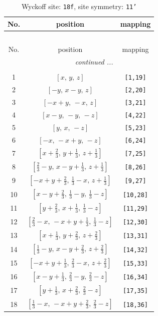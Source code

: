 \documentclass[fleqn,8pt]{jsarticle}
\begin{document}
\begin{longtable}{ccc}
\caption{Wyckoff site: {\tt 18f}, site symmetry: {\tt 11'}}
 \\
 \hline \hline
No. & position & mapping \\ \hline \endfirsthead

\multicolumn{2}{l}{\tablename\ \thetable{}} \\
 \hline \hline
No. & position & mapping \\ \hline \endhead

 \hline \hline
\multicolumn{2}{r}{\footnotesize\it continued ...} \\ \endfoot

 \hline \hline
\multicolumn{2}{r}{} \\ \endlastfoot

1 & $\left[ x,\, y,\, z \right]$ & {\tt [1,19]} \\ \hline
2 & $\left[ - y,\, x - y,\, z \right]$ & {\tt [2,20]} \\ \hline
3 & $\left[ - x + y,\, - x,\, z \right]$ & {\tt [3,21]} \\ \hline
4 & $\left[ x - y,\, - y,\, - z \right]$ & {\tt [4,22]} \\ \hline
5 & $\left[ y,\, x,\, - z \right]$ & {\tt [5,23]} \\ \hline
6 & $\left[ - x,\, - x + y,\, - z \right]$ & {\tt [6,24]} \\ \hline
7 & $\left[ x + \frac{2}{3},\, y + \frac{1}{3},\, z + \frac{1}{3} \right]$ & {\tt [7,25]} \\ \hline
8 & $\left[ \frac{2}{3} - y,\, x - y + \frac{1}{3},\, z + \frac{1}{3} \right]$ & {\tt [8,26]} \\ \hline
9 & $\left[ - x + y + \frac{2}{3},\, \frac{1}{3} - x,\, z + \frac{1}{3} \right]$ & {\tt [9,27]} \\ \hline
10 & $\left[ x - y + \frac{2}{3},\, \frac{1}{3} - y,\, \frac{1}{3} - z \right]$ & {\tt [10,28]} \\ \hline
11 & $\left[ y + \frac{2}{3},\, x + \frac{1}{3},\, \frac{1}{3} - z \right]$ & {\tt [11,29]} \\ \hline
12 & $\left[ \frac{2}{3} - x,\, - x + y + \frac{1}{3},\, \frac{1}{3} - z \right]$ & {\tt [12,30]} \\ \hline
13 & $\left[ x + \frac{1}{3},\, y + \frac{2}{3},\, z + \frac{2}{3} \right]$ & {\tt [13,31]} \\ \hline
14 & $\left[ \frac{1}{3} - y,\, x - y + \frac{2}{3},\, z + \frac{2}{3} \right]$ & {\tt [14,32]} \\ \hline
15 & $\left[ - x + y + \frac{1}{3},\, \frac{2}{3} - x,\, z + \frac{2}{3} \right]$ & {\tt [15,33]} \\ \hline
16 & $\left[ x - y + \frac{1}{3},\, \frac{2}{3} - y,\, \frac{2}{3} - z \right]$ & {\tt [16,34]} \\ \hline
17 & $\left[ y + \frac{1}{3},\, x + \frac{2}{3},\, \frac{2}{3} - z \right]$ & {\tt [17,35]} \\ \hline
18 & $\left[ \frac{1}{3} - x,\, - x + y + \frac{2}{3},\, \frac{2}{3} - z \right]$ & {\tt [18,36]} \\
\end{longtable}
\end{document}

